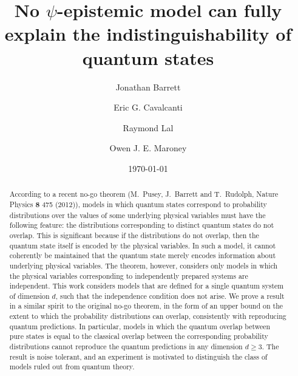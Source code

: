 \documentclass[prl,twocolumn,superscriptaddress]{revtex4-1}
\theoremstyle{remark}
\theoremstyle{definition}
\begin{document}
\title{No $\psi$-epistemic model can fully explain the indistinguishability of quantum states}
\author{Jonathan Barrett}
\author{Eric G. Cavalcanti}
\author{Raymond Lal}
\author{Owen J. E. Maroney}
\date{\today}

\begin{abstract}

According to a recent no-go theorem (M.~Pusey, J.~Barrett and T.~Rudolph, Nature Physics {\bf 8} 475 (2012)), models in which quantum states correspond to probability distributions over the values of some underlying physical variables must have the following feature: the distributions corresponding to distinct quantum states do not overlap. This is significant because if the distributions do not overlap, then the quantum state itself is encoded by the physical variables. In such a model, it cannot coherently be maintained that the quantum state merely encodes information about underlying physical variables. The theorem, however, considers only models in which the physical variables corresponding to independently prepared systems are independent. This work considers models that are defined for a single quantum system of dimension $d$, such that the independence condition does not arise. We prove a result in a similar spirit to the original no-go theorem, in the form of an upper bound on the extent to which the probability distributions can overlap, consistently with reproducing quantum predictions. In particular, models in which the quantum overlap between pure states is equal to the classical overlap between the corresponding probability distributions cannot reproduce the quantum predictions in any dimension $d \geq 3$. The result is noise tolerant, and an experiment is motivated to distinguish the class of models ruled out from quantum theory.
\end{abstract}
\maketitle



%


\newpage

\appendix*


\end{document}
